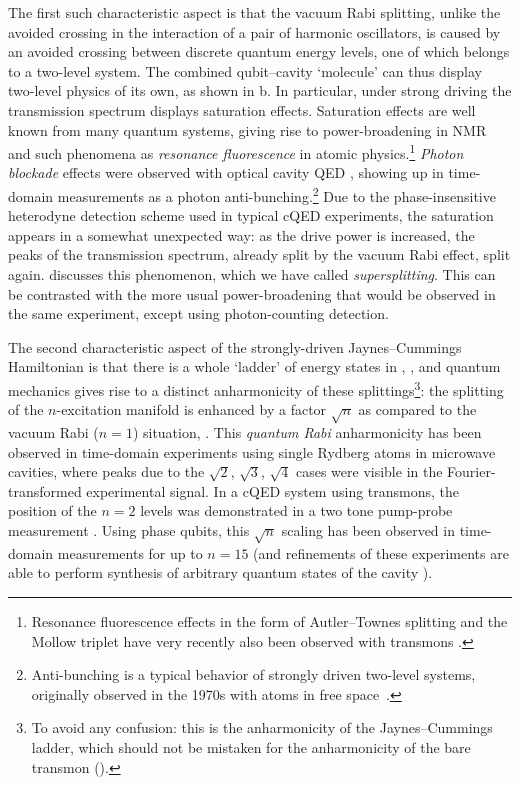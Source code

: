 The first such characteristic aspect is that the vacuum Rabi splitting, unlike the avoided crossing in the interaction of a pair of harmonic oscillators, is caused by an avoided crossing between discrete quantum energy levels, one of which belongs to a two-level system. The combined qubit--cavity `molecule' can thus display two-level physics of its own, as shown in b. In particular, under strong driving the transmission spectrum displays saturation effects. Saturation effects are well known from many quantum systems, giving rise to power-broadening in NMR and such phenomena as \emph{resonance fluorescence} in atomic physics.\footnote{Resonance fluorescence effects in the form of Autler--Townes splitting and the Mollow triplet have very recently also been observed with transmons \cite{baur_measurement_2009}.} \emph{Photon blockade} effects were observed with optical cavity QED \cite{birnbaum_photon_2005}, showing up in time-domain measurements as a photon anti-bunching.\footnote{Anti-bunching is a typical behavior of strongly driven two-level systems, originally observed in the 1970s with atoms in free space~\cite{kimble_theory_1976,
kimble_photon_1977,kimble_multiatom_1978,dagenais_investigation_1978}.} Due to the phase-insensitive heterodyne detection scheme used in typical cQED experiments, the saturation appears in a somewhat unexpected way: as the drive power is increased, the peaks of the transmission spectrum, already split by the vacuum Rabi effect, split again.  discusses this phenomenon, which we have called \emph{supersplitting}. This can be contrasted with the more usual power-broadening that would be observed in the same experiment, except using photon-counting detection.

The second characteristic aspect of the strongly-driven Jaynes--Cummings Hamiltonian is that there is a whole `ladder' of energy states in , , and quantum mechanics gives rise to a distinct anharmonicity of these splittings\footnote{To avoid any confusion: this is the anharmonicity of the Jaynes--Cummings ladder, which should not be mistaken for the anharmonicity of the bare transmon ().}: the splitting of the $n$-excitation manifold is enhanced by a factor $\sqrt{n}$ as compared to the vacuum Rabi ($n=1$) situation, . This \emph{quantum Rabi} anharmonicity has been observed in time-domain experiments using single Rydberg atoms in microwave \cite{brune_quantum_1996} cavities, where peaks due to the $\sqrt{2}$, $\sqrt{3}$,  $\sqrt{4}$ cases were visible in the Fourier-transformed experimental signal. In a cQED system using transmons, the position of the $n=2$ levels was demonstrated in a two tone pump-probe measurement \cite{fink_climbing_2008}. Using phase qubits, this $\sqrt{n}$ scaling has been observed in time-domain measurements for up to $n=15$ \cite{hofheinz_generation_2008, wang_measurement_2008} (and refinements of these experiments are able to perform synthesis of arbitrary quantum states of the cavity \cite{hofheinz_synthesizing_2009}).

